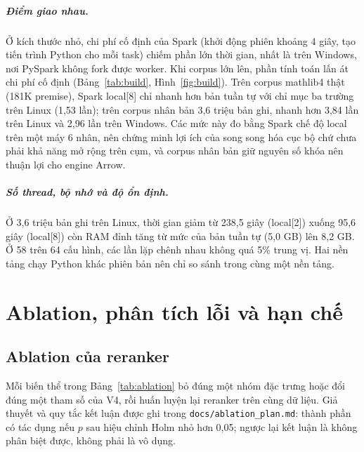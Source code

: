 \documentclass[11pt,a4paper,oneside]{report}
\newcommand{\code}[1]{\texttt{#1}}
\begin{document}
\paragraph{Điểm giao nhau.} Ở kích thước nhỏ, chi phí cố định của Spark (khởi động phiên khoảng 4 giây, tạo tiến trình
Python cho mỗi task) chiếm phần lớn thời gian, nhất là trên Windows, nơi PySpark không fork được worker. Khi corpus lớn lên,
phần tính toán lấn át chi phí cố định (Bảng~\ref{tab:build}, Hình~\ref{fig:build}). Trên corpus mathlib4 thật (181K premise),
Spark local[8] chỉ nhanh hơn bản tuần tự với chỉ mục ba trường trên Linux (1,53 lần); trên corpus nhân bản 3,6 triệu bản
ghi, nhanh hơn 3,84 lần trên Linux và 2,96 lần trên Windows. Các mức này đo bằng Spark chế độ local trên một máy 6 nhân,
nên chứng minh lợi ích của song song hóa cục bộ chứ chưa phải khả năng mở rộng trên cụm, và corpus nhân bản giữ nguyên số
khóa nên thuận lợi cho engine Arrow.

\paragraph{Số thread, bộ nhớ và độ ổn định.} Ở 3,6 triệu bản ghi trên Linux, thời gian giảm từ 238,5 giây (local[2]) xuống
95,6 giây (local[8]) còn RAM đỉnh tăng từ mức của bản tuần tự (5,0 GB) lên 8,2 GB. Ở 58 trên 64 cấu hình, các lần lặp chênh
nhau không quá 5\% trung vị. Hai nền tảng chạy Python khác phiên bản nên chỉ so sánh trong cùng một nền tảng.

\chapter{Ablation, phân tích lỗi và hạn chế}\label{sec:ablation}

\section{Ablation của reranker}\label{sec:ablation-rerank}

Mỗi biến thể trong Bảng~\ref{tab:ablation} bỏ đúng một nhóm đặc trưng hoặc đổi đúng một tham số của V4, rồi huấn luyện
lại reranker trên cùng dữ liệu. Giả thuyết và quy tắc kết luận được ghi trong \code{docs/ablation\_plan.md}: thành phần có
tác dụng nếu $p$ sau hiệu chỉnh Holm nhỏ hơn 0,05; ngược lại kết luận là không phân biệt được, không phải là vô dụng.




\end{document}
